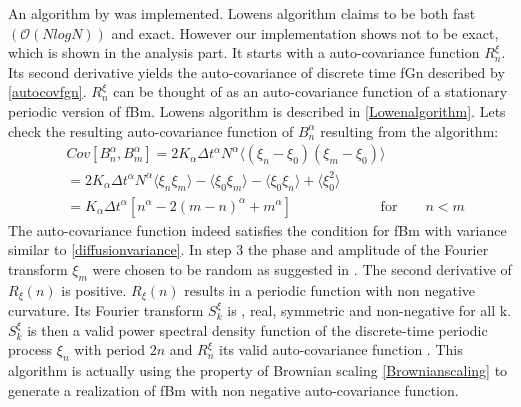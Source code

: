 \documentclass[
  a4paper,BCOR10mm,oneside,
  headsepline,footsepline,%
  fleqn,openbib
]{scrbook}
\begin{document}
 An algorithm by \citet{Lowen1999} was implemented. Lowens algorithm claims to be both fast $(\mathcal{O}(NlogN))$ and exact. However our implementation shows not to be exact, which is shown in the analysis part. It starts with a auto-covariance function $R^{\xi}_n$. Its second derivative yields the auto-covariance of discrete time fGn described by \cref{autocovfgn}. $R^{\xi}_n$ can be thought of as an auto-covariance function of a stationary periodic version of fBm. Lowens algorithm is described in \cref{Lowenalgorithm}. Lets check the resulting auto-covariance function of $B^{\alpha}_n$ resulting from the algorithm: 
\begin{align}
  & Cov[B^{\alpha}_n,B^{\alpha}_m]= 2 K_{\alpha} \Delta t^{\alpha} N^{\alpha} \langle (\xi_n- \xi_0) (\xi_m- \xi_0)\rangle \\
 &=  2 K_{\alpha} \Delta t^{\alpha} N^{\alpha}\langle\xi_n \xi_m\rangle -\langle \xi_0 \xi_m \rangle - \langle \xi_0 \xi_n\rangle +\langle \xi_0^2\rangle \\ 
 &= K_{\alpha} \Delta t^{\alpha}[n^{\alpha}-2(m-n)^{\alpha}+m^{\alpha}]\qquad \qquad \qquad \text{ for} \qquad n < m
\end{align}
The auto-covariance function indeed satisfies the condition for fBm with variance similar to \cref{diffusionvariance}. In step 3 the phase and amplitude of the Fourier transform  $\xi_m$ were chosen to be random  as suggested in \cite{Timmer1995}. The second derivative of $R_{\xi}(n) $ is positive. $R_{\xi}(n) $ results in a periodic function with non negative curvature. Its Fourier transform $S^{\xi}_k$ is , real, symmetric  and non-negative for all k. $S^{\xi}_k$ is then a valid power spectral density function of the discrete-time periodic process $\xi_n$ with period $2n$ and  $R^{\xi}_n$ its valid auto-covariance function \cite{Lowen1999}. This algorithm is actually using the property of Brownian scaling \cref{Brownianscaling} to generate a realization of fBm  with non negative auto-covariance function. 
\end{document}
